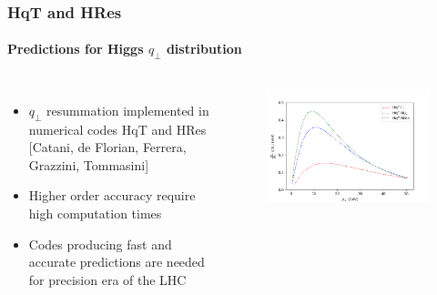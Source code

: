 \documentclass[aspectratio=43]{beamer}
\begin{document}
\begin{frame}


\end{frame}

\begin{frame}

	\frametitle{HqT and HRes}
	\framesubtitle{Predictions for Higgs $q_{\perp}$ distribution}
	
	\begin{columns}
		
			
		\begin{itemize}
			\item $q_{\perp}$ resummation implemented in numerical codes HqT and HRes {\color{blue}[Catani, de Florian, Ferrera, Grazzini, Tommasini]} 
			\item Higher order accuracy require {\color{red}high computation times}
			\item Codes producing fast and accurate predictions are needed for precision era of the LHC
		\end{itemize}

	
		\begin{figure}
			\includegraphics[width = 7 cm]{plots/part_III/higgs_qt_all.png}
		\end{figure}		
			
	\end{columns}

\end{frame}
\end{document}
